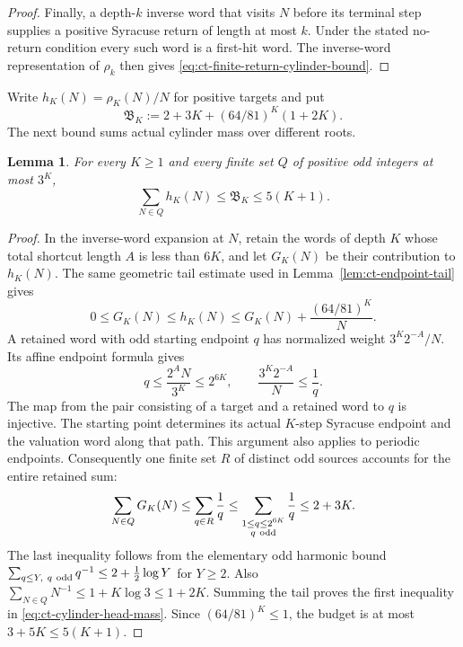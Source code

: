 \documentclass[11pt,a4paper]{article}
\newtheorem{lemma}[theorem]{Lemma}
\begin{document}
\begin{proof}
Finally, a depth-\(k\) inverse word that visits \(N\) before its
terminal step supplies a positive Syracuse return of length at
most \(k\). Under the stated no-return condition every such
word is a first-hit word. The inverse-word representation of
\(\rho_k\) then gives \eqref{eq:ct-finite-return-cylinder-bound}.
\end{proof}

Write \(h_K(N)=\rho_K(N)/N\) for positive targets and put
\[
 \mathfrak B_K:=2+3K+(64/81)^K(1+2K).
\]
The next bound sums actual cylinder mass over different roots.

\begin{lemma}\label{lem:ct-cylinder-head-mass}
For every \(K\ge1\) and every finite set \(Q\) of positive odd
integers at most \(3^K\),
\begin{equation}\label{eq:ct-cylinder-head-mass}
 \sum_{N\in Q}h_K(N)\le\mathfrak B_K\le5(K+1).
\end{equation}
\end{lemma}
\begin{proof}
In the inverse-word expansion at \(N\), retain the words of
depth \(K\) whose total shortcut length \(A\) is less than
\(6K\), and let \(G_K(N)\) be their contribution to \(h_K(N)\).
The same geometric tail estimate used in
Lemma~\ref{lem:ct-endpoint-tail} gives
\[
 0\le G_K(N)\le h_K(N)
       \le G_K(N)+\frac{(64/81)^K}{N}.
\]
A retained word with odd starting endpoint \(q\) has normalized
weight \(3^K2^{-A}/N\). Its affine endpoint formula gives
\[
 q\le\frac{2^AN}{3^K}\le2^{6K},\qquad
 \frac{3^K2^{-A}}N\le\frac1q.
\]
The map from the pair consisting of a target and a retained word
to \(q\) is injective. The starting point determines its actual
\(K\)-step Syracuse endpoint and the valuation word along that
path. This argument also applies to periodic endpoints.
Consequently one finite set \(R\) of distinct odd sources
accounts for the entire retained sum:
\[
 \sum_{N\in Q}G_K(N)\le\sum_{q\in R}\frac1q
   \le\sum_{\substack{1\le q\le2^{6K}\\q\ {\rm odd}}}\frac1q
   \le2+3K.
\]
The last inequality follows from the elementary odd harmonic
bound \(\sum_{q\le Y,\ q\ {\rm odd}}q^{-1}
\le2+\tfrac12\log Y\) for \(Y\ge2\).
Also \(\sum_{N\in Q}N^{-1}\le1+K\log3\le1+2K\).
Summing the tail proves the first inequality in
\eqref{eq:ct-cylinder-head-mass}. Since \((64/81)^K\le1\),
the budget is at most \(3+5K\le5(K+1)\).
\end{proof}
\end{document}
